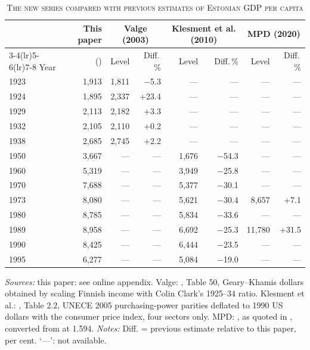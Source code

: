 \begin{table}[htbp]
\centering\small
\caption[The new series compared with previous estimates of Estonian GDP per capita]{\textsc{The new series compared with previous estimates of Estonian GDP per capita}}
\label{tab:previous}
\begin{threeparttable}
\begin{tabular}{lrrrrrrr}
\toprule
& This paper & \multicolumn{2}{c}{Valge (2003)} & \multicolumn{2}{c}{Klesment et al. (2010)} & \multicolumn{2}{c}{MPD (2020)} \\
\cmidrule(lr){3-4}\cmidrule(lr){5-6}\cmidrule(lr){7-8}
Year & (\intlnineteen{}) & Level & Diff.\,\% & Level & Diff.\,\% & Level & Diff.\,\% \\
\midrule
1923 & 1,913 & 1,811 & $-$5.3 & --- & --- & --- & --- \\
1924 & 1,895 & 2,337 & +23.4 & --- & --- & --- & --- \\
1929 & 2,113 & 2,182 & +3.3 & --- & --- & --- & --- \\
1932 & 2,105 & 2,110 & +0.2 & --- & --- & --- & --- \\
1938 & 2,685 & 2,745 & +2.2 & --- & --- & --- & --- \\
1950 & 3,667 & --- & --- & 1,676 & $-$54.3 & --- & --- \\
1960 & 5,319 & --- & --- & 3,949 & $-$25.8 & --- & --- \\
1970 & 7,688 & --- & --- & 5,377 & $-$30.1 & --- & --- \\
1973 & 8,080 & --- & --- & 5,621 & $-$30.4 & 8,657 & +7.1 \\
1980 & 8,785 & --- & --- & 5,834 & $-$33.6 & --- & --- \\
1989 & 8,958 & --- & --- & 6,692 & $-$25.3 & 11,780 & +31.5 \\
1990 & 8,425 & --- & --- & 6,444 & $-$23.5 & --- & --- \\
1995 & 6,277 & --- & --- & 5,084 & $-$19.0 & --- & --- \\
\bottomrule
\end{tabular}
\begin{tablenotes}
\footnotesize
\textit{Sources:} this paper: see online appendix. Valge: \cite[2726]{valge2003all}, Table 50, Geary--Khamis dollars obtained by scaling Finnish income with Colin Clark's 1925--34 ratio. Klesment et al.: \cite[44]{klesment2010}, Table 2.2, UNECE 2005 purchasing-power parities deflated to 1990 US dollars with the consumer price index, four sectors only. MPD: \cite{mpd2020}, as quoted in \cite[155]{norkus_restorations}, converted from \intltwenty{} at 1.594. \textit{Notes:} Diff. = previous estimate relative to this paper, per cent. `---': not available.
\end{tablenotes}
\end{threeparttable}
\end{table}
